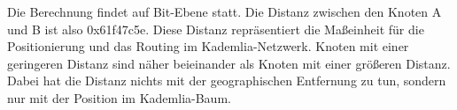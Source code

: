 \noindent Die Berechnung findet auf Bit-Ebene statt. Die Distanz zwischen den Knoten A und B ist also 0x61f47c5e. Diese Distanz repräsentiert die Maßeinheit für die Positionierung und das Routing im Kademlia-Netzwerk. Knoten mit einer geringeren Distanz sind näher beieinander als Knoten mit einer größeren Distanz. Dabei hat die Distanz nichts mit der geographischen Entfernung zu tun, sondern nur mit der Position im Kademlia-Baum.
\\

